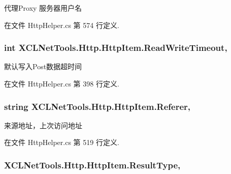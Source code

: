 代理\-Proxy 服务器用户名 



在文件 Http\-Helper.\-cs 第 574 行定义.

\hypertarget{class_x_c_l_net_tools_1_1_http_1_1_http_item_a5a3c4b7bd1d06a2965e29bae818e358b}{
\subsubsection[{Read\-Write\-Timeout}]{\setlength{\rightskip}{0pt plus 5cm}int X\-C\-L\-Net\-Tools.\-Http.\-Http\-Item.\-Read\-Write\-Timeout\hspace{0.3cm}{\ttfamily [get]}, {\ttfamily [set]}}}\label{class_x_c_l_net_tools_1_1_http_1_1_http_item_a5a3c4b7bd1d06a2965e29bae818e358b}


默认写入\-Post数据超时间 



在文件 Http\-Helper.\-cs 第 398 行定义.

\hypertarget{class_x_c_l_net_tools_1_1_http_1_1_http_item_acff06911fc5e2dd65812dc14c3960272}{
\subsubsection[{Referer}]{\setlength{\rightskip}{0pt plus 5cm}string X\-C\-L\-Net\-Tools.\-Http.\-Http\-Item.\-Referer\hspace{0.3cm}{\ttfamily [get]}, {\ttfamily [set]}}}\label{class_x_c_l_net_tools_1_1_http_1_1_http_item_acff06911fc5e2dd65812dc14c3960272}


来源地址，上次访问地址 



在文件 Http\-Helper.\-cs 第 519 行定义.

\hypertarget{class_x_c_l_net_tools_1_1_http_1_1_http_item_aacea6cef89d9f46a31ee98b4e6559860}{
\subsubsection[{Result\-Type}]{ X\-C\-L\-Net\-Tools.\-Http.\-Http\-Item.\-Result\-Type\hspace{0.3cm}{\ttfamily [get]}, {\ttfamily [set]}}}\label{class_x_c_l_net_tools_1_1_http_1_1_http_item_aacea6cef89d9f46a31ee98b4e6559860}


